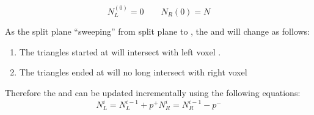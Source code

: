 \begin{displaymath} 
    N_{L}^{(0)} = 0 \qquad N_{R}{(0)} = N
\end{displaymath} 

As the split plane ``sweeping'' from split plane  to , the \mynumtrileft and \mynumtriright will change as follows: 
\begin{enumerate} 
    \item The triangles started at  will intersect with left voxel \myleftchildbox. 
    \item The triangles ended at  will no long intersect with right voxel \myrightchildbox 
\end{enumerate}

Therefore the \mynumtrileft and \mynumtriright can be updated incrementally using the following equations: 
\begin{equation}
        N_{L}^{i} = N_{L}^{i-1} + p^{+}
        N_{R}^{i} = N_{R}^{i-1} - p^{-}
    \label{eq:SweepUpdate}
\end{equation}

